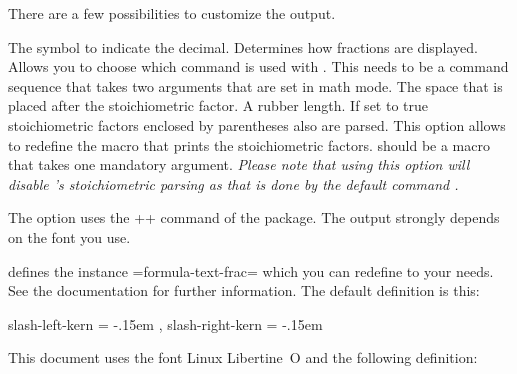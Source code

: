 \documentclass[load-preamble+]{cnltx-doc}
\begin{document}
There are a few possibilities to customize the output.
\begin{options}
    The symbol to indicate the decimal.
    Determines how fractions are displayed.
    Allows you to choose which command is used with
    .  This needs to be a command sequence that takes
    two arguments that are set in math mode.
    The space that is placed after the stoichiometric factor.  A rubber
    length.
    If set to true stoichiometric factors enclosed by parentheses also are
    parsed.
    This option allows to redefine the macro that prints the stoichiometric
    factors.   should be a macro that takes one mandatory argument.
    \emph{Please note that using this option will disable \chemformula's
      stoichiometric parsing as that is done by the default command
      .}
\end{options}

\begin{example}
    
\end{example}

The option  uses the \verbcode+\sfrac+ command of the
 package.  The output strongly depends on the font you use.
\begin{example}
   
\end{example}
\chemformula{} defines the instance \verbcode=formula-text-frac= which you can
redefine to your needs.  See the  documentation for further
information.  The default definition is this:
\begin{sourcecode}
   {
     slash-left-kern  = -.15em ,
     slash-right-kern = -.15em
   }
\end{sourcecode}
This document uses the font Linux Libertine~O and the following definition:
\end{document}
